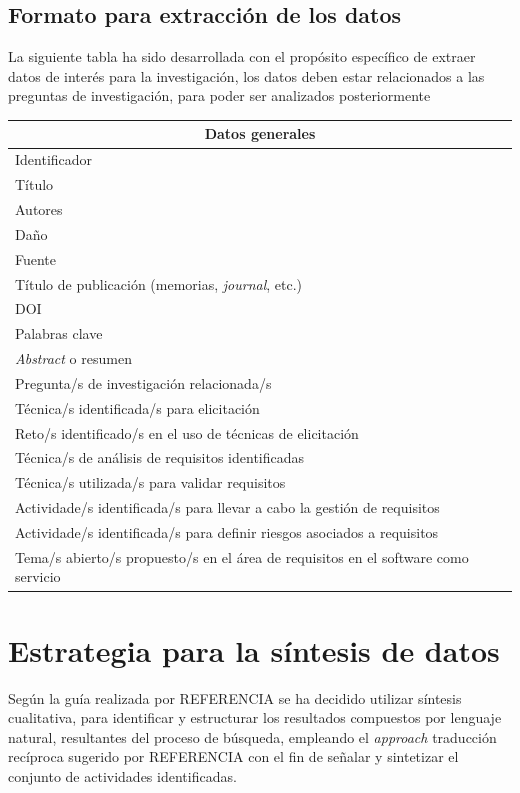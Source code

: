 \documentclass{article}
\begin{document}
\subsection{Formato para extracción de los datos}
La siguiente tabla ha sido desarrollada con el propósito específico de extraer datos de interés para la investigación, 
los datos deben estar relacionados a las preguntas de investigación, para poder ser analizados posteriormente 

\begin{center}
\begin{tabular}{ |l|l| }
\hline
\multicolumn{2}{|c|}{Datos generales} \\
  \hline
    Identificador &       \\
    \hline
    Título & \\
    \hline
    Autores &\\
    \hline
    Daño & \\
    \hline
    Fuente & \\
    \hline
    Título de publicación (memorias, \emph{journal}, etc.) & \\
    \hline
    DOI & \\
    \hline
    Palabras clave & \\
    \hline
    \emph{Abstract} o resumen & \\
    \hline
    Pregunta/s de investigación relacionada/s & \\
    \hline
    Técnica/s identificada/s para elicitación& \\
    \hline
    Reto/s identificado/s en el uso de técnicas de elicitación& \\
    \hline
    Técnica/s de análisis de requisitos identificadas& \\
    \hline
    Técnica/s utilizada/s para validar requisitos & \\
    \hline
    Actividade/s identificada/s para llevar a cabo la gestión de requisitos& \\
    \hline
    Actividade/s identificada/s para definir riesgos asociados a requisitos& \\
    \hline
    Tema/s abierto/s propuesto/s en el área de requisitos en el software como servicio& \\
    \hline
 \hline
\end{tabular}
\end{center}

\section{Estrategia para la síntesis de datos}
Según la guía realizada por REFERENCIA se ha decidido utilizar síntesis cualitativa, para identificar y estructurar los resultados compuestos por 
lenguaje natural, resultantes del proceso de búsqueda, empleando el \emph{approach} traducción recíproca sugerido por REFERENCIA con el fin de señalar 
y sintetizar el conjunto de actividades identificadas.
\newpage
\end{document}
